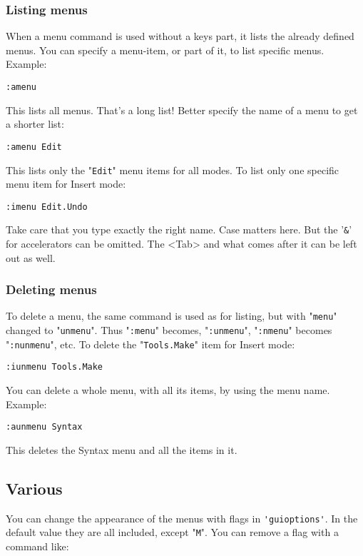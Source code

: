 \subsubsection{Listing menus}
When a menu command is used without a {keys} part, it lists the already defined menus.
You can specify a {menu-item}, or part of it, to list specific menus.
Example:

\begin{Verbatim}[samepage=true]
 :amenu
\end{Verbatim}

This lists all menus.
That's a long list!  Better specify the name of a menu to get a shorter list:

\begin{Verbatim}[samepage=true]
 :amenu Edit
\end{Verbatim}

This lists only the "\verb!Edit!" menu items for all modes.
To list only one specific menu item for Insert mode:

\begin{Verbatim}[samepage=true]
 :imenu Edit.Undo
\end{Verbatim}

Take care that you type exactly the right name.
Case matters here.
But the '\verb!&!' for accelerators can be omitted.
The <Tab> and what comes after it can be left out as well.

\subsubsection{Deleting menus}
To delete a menu, the same command is used as for listing, but with "\verb!menu!" changed to "\verb!unmenu!".
Thus "\verb!:menu!" becomes, "\verb!:unmenu!", "\verb!:nmenu!" becomes "\verb!:nunmenu!", etc.
To delete the "\verb!Tools.Make!" item for Insert mode:

\begin{Verbatim}[samepage=true]
 :iunmenu Tools.Make
\end{Verbatim}

You can delete a whole menu, with all its items, by using the menu name.
Example:

\begin{Verbatim}[samepage=true]
 :aunmenu Syntax
\end{Verbatim}

This deletes the Syntax menu and all the items in it.
\subsection{Various}
You can change the appearance of the menus with flags in \verb!'guioptions'!.
In the default value they are all included, except "\verb!M!".
You can remove a flag with a command like:

